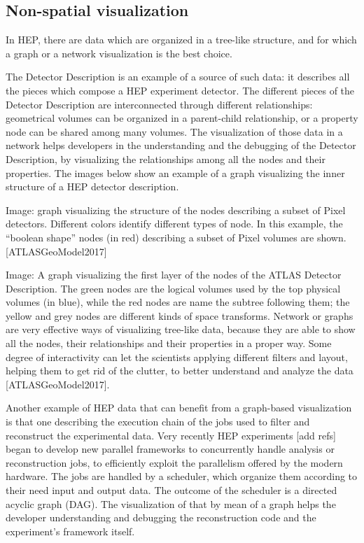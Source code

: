 \documentclass[12pt,a4paper]{article}
\begin{document}
\hypertarget{non-spatial-visualization}{%
\subsection{Non-spatial visualization}\label{non-spatial-visualization}}

In HEP, there are data which are organized in a tree-like structure, and for which a graph or a network visualization is the best choice.

The Detector Description is an example of a source of such data: it describes all the pieces which compose a HEP experiment detector.
The different pieces of the Detector Description are interconnected through different relationships: geometrical volumes can be organized
in a parent-child relationship, or a property node can be shared among many volumes. The visualization of those data in a network helps
developers in the understanding and the debugging of the Detector Description, by visualizing the relationships among all the nodes and
their properties. The images below show an example of a graph visualizing the inner structure of a HEP detector description.

Image: graph visualizing the structure of the nodes describing a subset of Pixel detectors. Different colors identify different types
of node. In this example, the “boolean shape” nodes (in red) describing a subset of Pixel volumes are shown. [ATLASGeoModel2017]

Image: A graph visualizing the first layer of the nodes of the ATLAS Detector Description. The green nodes are the logical volumes used
by the top physical volumes (in blue), while the red nodes are name the subtree following them; the yellow and grey nodes are different
kinds of space transforms. Network or graphs are very effective ways of visualizing tree-like data, because they are able to show all the
nodes, their relationships and their properties in a proper way. Some degree of interactivity can let the scientists applying different
filters and layout, helping them to get rid of the clutter, to better understand and analyze the data [ATLASGeoModel2017].

Another example of HEP data that can benefit from a graph-based visualization is that one describing the execution chain of the jobs
used to filter and reconstruct the experimental data. Very recently HEP experiments [add refs] began to develop new parallel frameworks
to concurrently handle analysis or reconstruction jobs, to efficiently exploit the parallelism offered by the modern hardware.
The jobs are handled by a scheduler, which organize them according to their need input and output data. The outcome of the scheduler
is a directed acyclic graph (DAG). The visualization of that by mean of a graph helps the developer understanding and debugging the
reconstruction code and the experiment’s framework itself.
\end{document}
